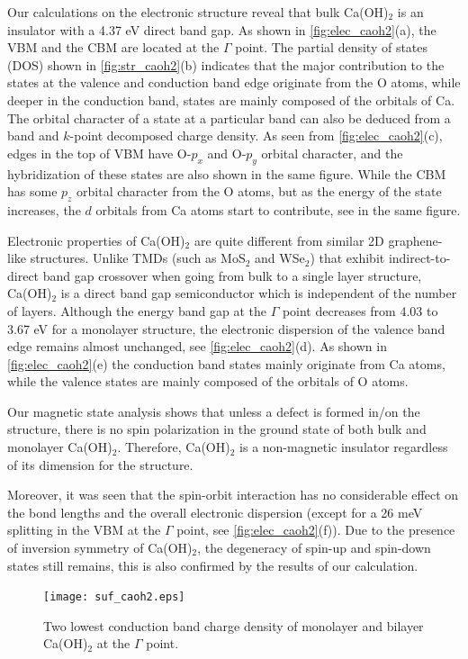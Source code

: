 Our calculations on the electronic structure reveal that bulk Ca(OH)$_2$ is 
an insulator with a 4.37 eV direct band gap. As shown in \autoref{fig:elec_caoh2}(a), the VBM and the CBM are located at the $\Gamma$ point. The partial density of 
states (DOS) shown in \autoref{fig:str_caoh2}(b) indicates that the major 
contribution to the states at the valence and conduction band edge originate 
from the O atoms, while deeper in the conduction band, states are mainly composed 
of the orbitals of Ca. The orbital character of a state at a particular band can 
also be deduced from a band and $k$-point decomposed charge density. As seen 
from \autoref{fig:elec_caoh2}(c), edges in the top of VBM have O-$p_x$ 
and O-$p_y$ orbital character, and the hybridization of these states are also 
shown in the same figure. While the CBM has some $p_z$ orbital 
character from the O atoms, but as the energy of the state increases, the $d$ 
orbitals from Ca atoms start to contribute, see  in the same figure.

Electronic properties of Ca(OH)$_2$ are quite different from similar
2D graphene-like structures. Unlike TMDs (such as MoS$_2$ and
WSe$_2$) that exhibit indirect-to-direct band gap crossover when going
from bulk to a single layer structure, Ca(OH)$_2$ is a direct band gap
semiconductor which is independent of the number of layers. Although the energy band gap
at the $\Gamma$ point decreases from 4.03 to 3.67 eV for a monolayer structure,
the electronic dispersion of the valence band edge remains almost unchanged, see
\autoref{fig:elec_caoh2}(d). As shown in \autoref{fig:elec_caoh2}(e)  
the conduction band states mainly originate from Ca atoms, while the valence states 
are mainly composed of the orbitals of O atoms. 

Our magnetic state analysis shows that unless a defect is formed in/on the 
structure, there is no spin polarization in the ground state of both bulk and monolayer Ca(OH)$_2$. Therefore, Ca(OH)$_2$ is a non-magnetic insulator regardless of its dimension for the structure. 

Moreover, it was seen that the spin-orbit interaction has no 
considerable effect on the bond lengths and the overall electronic dispersion 
(except for a 26 meV splitting in the VBM at the 
$\Gamma$ point, see \autoref{fig:elec_caoh2}(f)). Due to the presence of inversion symmetry of Ca(OH)$_2$, the 
degeneracy of spin-up and spin-down states still remains, this is also confirmed 
by the results of our calculation.

\begin{figure}[htb]
\centering
\texttt{[image: suf\_caoh2.eps]}
\caption{\label{fig:suf_caoh2} Two lowest conduction band charge density of 
monolayer and bilayer Ca(OH)$_2$ at the $\Gamma$ point.}
\end{figure}

